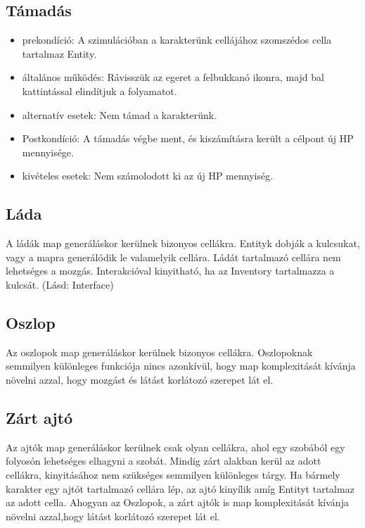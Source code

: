 \subsection{Támadás}

\begin{itemize}
    \item prekondíció: A szimulációban a karakterünk cellájához szomszédos cella tartalmaz Entity.
    \item általános működés: Rávisszük az egeret a felbukkanó ikonra, majd bal kattintással elindítjuk a folyamatot.
    \item alternatív esetek: Nem támad a karakterünk.
    \item Postkondíció: A támadás végbe ment, és kiszámításra került a célpont új HP mennyisége.
    \item kivételes esetek: Nem számolodott ki az új HP mennyiség.
\end{itemize}


\subsection{Láda}

A ládák map generáláskor kerülnek bizonyos cellákra.
Entityk dobják a kulcsukat, vagy a mapra generálódik le valamelyik cellára.
Ládát tartalmazó cellára nem lehetséges a mozgás.
Interakcióval kinyitható, ha az Inventory tartalmazza a kulcsát. (Lásd: Interface)

\subsection{Oszlop}

Az oszlopok map generáláskor kerülnek bizonyos cellákra.
Oszlopoknak semmilyen különleges funkciója nincs azonkívül, hogy map komplexitását kívánja növelni azzal,
hogy mozgást és látást korlátozó szerepet lát el.

\subsection{Zárt ajtó}

Az ajtók map generáláskor kerülnek csak olyan cellákra, ahol egy szobából egy folyosón lehetséges elhagyni a szobát.
Mindig zárt alakban kerül az adott cellákra, kinyitásához nem szükséges semmilyen különleges tárgy. Ha bármely karakter egy ajtót tartalmazó cellára lép, az ajtó kinyílik amíg Entityt tartalmaz az adott cella.
Ahogyan az Oszlopok, a zárt ajtók is map komplexitását kívánja növelni azzal,hogy látást korlátozó szerepet lát el.

